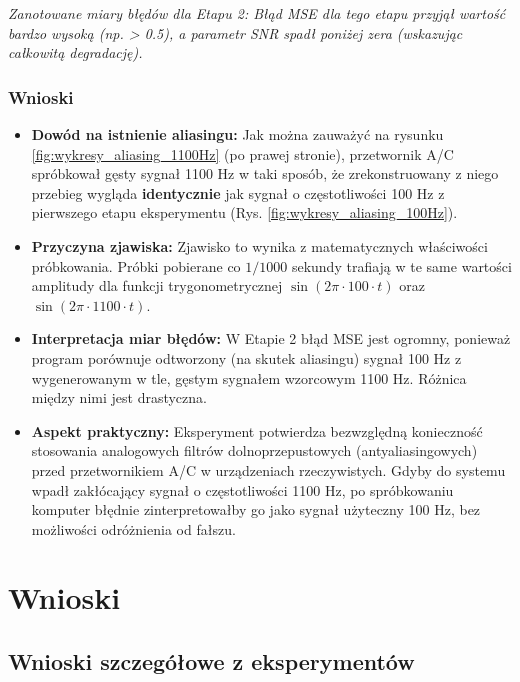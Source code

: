 \documentclass[12pt]{article}
\begin{document}
\textit{Zanotowane miary błędów dla Etapu 2: Błąd MSE dla tego etapu przyjął wartość bardzo wysoką (np. > 0.5), a parametr SNR spadł poniżej zera (wskazując całkowitą degradację).}

\vspace{0.5cm}

\subsubsection*{Wnioski}
\begin{itemize}
    \item \textbf{Dowód na istnienie aliasingu:} Jak można zauważyć na rysunku \ref{fig:wykresy_aliasing_1100Hz} (po prawej stronie), przetwornik A/C spróbkował gęsty sygnał 1100 Hz w taki sposób, że zrekonstruowany z niego przebieg wygląda \textbf{identycznie} jak sygnał o częstotliwości 100 Hz z pierwszego etapu eksperymentu (Rys. \ref{fig:wykresy_aliasing_100Hz}). 
    \item \textbf{Przyczyna zjawiska:} Zjawisko to wynika z matematycznych właściwości próbkowania. Próbki pobierane co $1/1000$ sekundy trafiają w te same wartości amplitudy dla funkcji trygonometrycznej $\sin(2\pi \cdot 100 \cdot t)$ oraz $\sin(2\pi \cdot 1100 \cdot t)$.
    \item \textbf{Interpretacja miar błędów:} W Etapie 2 błąd MSE jest ogromny, ponieważ program porównuje odtworzony (na skutek aliasingu) sygnał 100 Hz z wygenerowanym w tle, gęstym sygnałem wzorcowym 1100 Hz. Różnica między nimi jest drastyczna.
    \item \textbf{Aspekt praktyczny:} Eksperyment potwierdza bezwzględną konieczność stosowania analogowych filtrów dolnoprzepustowych (antyaliasingowych) przed przetwornikiem A/C w urządzeniach rzeczywistych. Gdyby do systemu wpadł zakłócający sygnał o częstotliwości 1100 Hz, po spróbkowaniu komputer błędnie zinterpretowałby go jako sygnał użyteczny 100 Hz, bez możliwości odróżnienia od fałszu.
\end{itemize}


\section{Wnioski}

\subsection*{Wnioski szczegółowe z eksperymentów}
\end{document}
